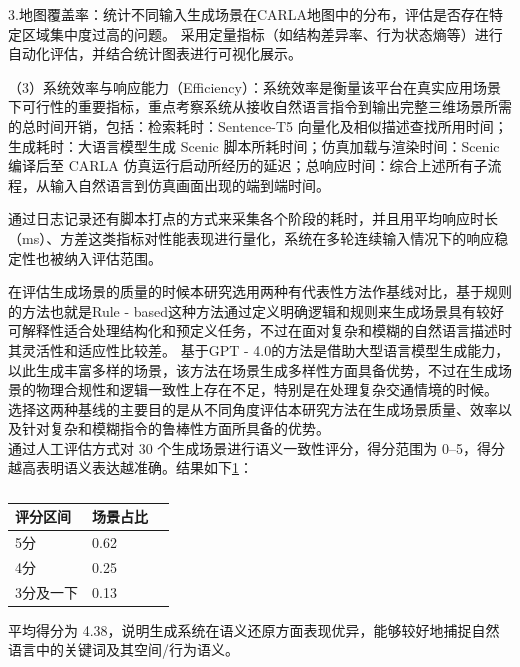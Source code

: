 3.地图覆盖率：统计不同输入生成场景在CARLA地图中的分布，评估是否存在特定区域集中度过高的问题。
	采用定量指标（如结构差异率、行为状态熵等）进行自动化评估，并结合统计图表进行可视化展示。
	
（3）系统效率与响应能力（Efficiency）：系统效率是衡量该平台在真实应用场景下可行性的重要指标，重点考察系统从接收自然语言指令到输出完整三维场景所需的总时间开销，包括：检索耗时：Sentence-T5 向量化及相似描述查找所用时间；生成耗时：大语言模型生成 Scenic 脚本所耗时间；仿真加载与渲染时间：Scenic 编译后至 CARLA 仿真运行启动所经历的延迟；总响应时间：综合上述所有子流程，从输入自然语言到仿真画面出现的端到端时间。

通过日志记录还有脚本打点的方式来采集各个阶段的耗时，并且用平均响应时长（ms）、方差这类指标对性能表现进行量化，系统在多轮连续输入情况下的响应稳定性也被纳入评估范围。

在评估生成场景的质量的时候本研究选用两种有代表性方法作基线对比，基于规则的方法也就是Rule - based这种方法通过定义明确逻辑和规则来生成场景具有较好可解释性适合处理结构化和预定义任务，不过在面对复杂和模糊的自然语言描述时其灵活性和适应性比较差。
基于GPT - 4.0的方法是借助大型语言模型生成能力，以此生成丰富多样的场景，该方法在场景生成多样性方面具备优势，不过在生成场景的物理合规性和逻辑一致性上存在不足，特别是在处理复杂交通情境的时候。
选择这两种基线的主要目的是从不同角度评估本研究方法在生成场景质量、效率以及针对复杂和模糊指令的鲁棒性方面所具备的优势。\\
通过人工评估方式对 30 个生成场景进行语义一致性评分，得分范围为 0–5，得分越高表明语义表达越准确。结果如下\ref{tab:dependencies}：
\begin{table}[htbp]
	\centering
	\begin{tabular}{lll}
		\hline
		\textbf{评分区间} & \textbf{场景占比} \\
		\hline
		5分 & 0.62 \\
		4分 & 0.25 \\
		3分及一下 & 0.13 \\
		\hline
	\end{tabular}
	\caption{}
	\label{tab:dependencies}
\end{table}


平均得分为 4.38，说明生成系统在语义还原方面表现优异，能够较好地捕捉自然语言中的关键词及其空间/行为语义。


